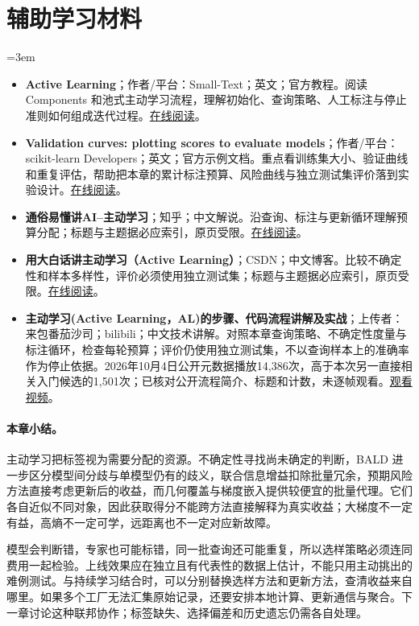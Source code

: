 \section*{辅助学习材料}
\begingroup
\emergencystretch=3em
\begin{itemize}
\item \textbf{Active Learning}；作者/平台：Small-Text；英文；官方教程。阅读 Components 和池式主动学习流程，理解初始化、查询策略、人工标注与停止准则如何组成迭代过程。\href{https://small-text.readthedocs.io/en/latest/active\_learning.html}{在线阅读}。
\item \textbf{Validation curves: plotting scores to evaluate models}；作者/平台：scikit-learn Developers；英文；官方示例文档。重点看训练集大小、验证曲线和重复评估，帮助把本章的累计标注预算、风险曲线与独立测试集评价落到实验设计。\href{https://scikit-learn.org/stable/modules/learning\_curve.html}{在线阅读}。
\item \textbf{通俗易懂讲AI--主动学习}；知乎；中文解说。沿查询、标注与更新循环理解预算分配；标题与主题据必应索引，原页受限。\href{https://zhuanlan.zhihu.com/p/676122996}{在线阅读}。
\item \textbf{用大白话讲主动学习（Active Learning）}；CSDN；中文博客。比较不确定性和样本多样性，评价必须使用独立测试集；标题与主题据必应索引，原页受限。\href{https://blog.csdn.net/qq\_51323826/article/details/144357831}{在线阅读}。
\item \textbf{主动学习(Active Learning，AL)的步骤、代码流程讲解及实战}；上传者：来包番茄沙司；bilibili；中文技术讲解。对照本章查询策略、不确定性度量与标注循环，检查每轮预算；评价仍使用独立测试集，不以查询样本上的准确率作为停止依据。2026年10月4日公开元数据播放14,386次，高于本次另一直接相关入门候选的1,501次；已核对公开流程简介、标题和计数，未逐帧观看。\href{https://www.bilibili.com/video/BV1y34y147xN/}{观看视频}。
\end{itemize}
\endgroup
\paragraph{本章小结。}
主动学习把标签视为需要分配的资源。不确定性寻找尚未确定的判断，BALD 进一步区分模型间分歧与单模型仍有的歧义，联合信息增益扣除批量冗余，预期风险方法直接考虑更新后的收益，而几何覆盖与梯度嵌入提供较便宜的批量代理。它们各自近似不同对象，因此获取得分不能跨方法直接解释为真实收益；大梯度不一定有益，高熵不一定可学，远距离也不一定对应新故障。

模型会判断错，专家也可能标错，同一批查询还可能重复，所以选样策略必须连同费用一起检验。上线效果应在独立且有代表性的数据上估计，不能只用主动挑出的难例测试。与持续学习结合时，可以分别替换选样方法和更新方法，查清收益来自哪里。如果多个工厂无法汇集原始记录，还要安排本地计算、更新通信与聚合。下一章讨论这种联邦协作；标签缺失、选择偏差和历史遗忘仍需各自处理。
